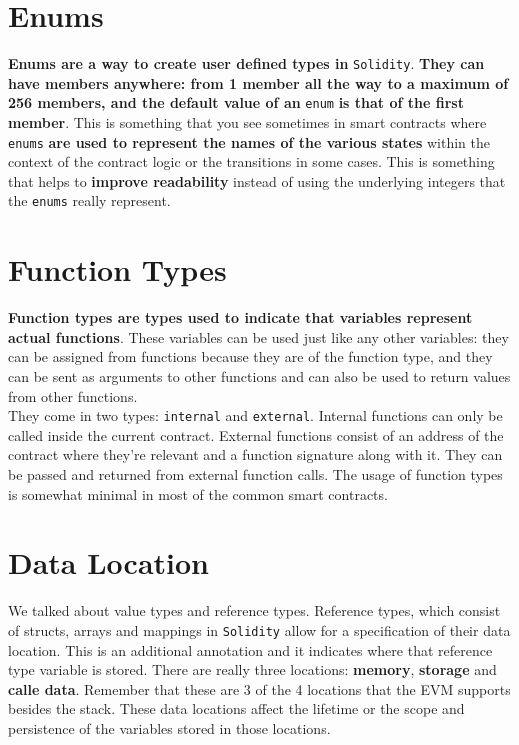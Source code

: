 \section{Enums}
\textbf{Enums are a way to create user defined types in} \texttt{Solidity}. \textbf{They can have members anywhere: from 1 member all the way to a maximum of 256 members, and the default value of an} \texttt{enum} \textbf{is that of the first member}. This is something that you see sometimes in smart contracts where \texttt{enums} \textbf{are used to represent the names of the various states} within the context of the contract logic or the transitions in some cases. This is something that helps to \textbf{improve readability} instead of using the underlying integers that the \texttt{enums} really represent.

\section{Function Types}
\textbf{Function types are types used to indicate that variables represent actual functions}. These variables can be used just like any other variables: they can be assigned from functions because they are of the function type, and they can be sent as arguments to other functions and can also be used to return values from other functions.\\
 
They come in two types: \texttt{internal} and \texttt{external}. Internal functions can only be called inside the current contract. External functions consist of an address of the contract where they're relevant and a function signature along with it. They can be passed and returned from external function calls. The usage of function types is somewhat minimal in most of the common smart contracts.

\section{Data Location}
We talked about value types and reference types. Reference types, which consist of structs, arrays and mappings in \texttt{Solidity} allow for a specification of their data location. This is an additional annotation and it indicates where that reference type variable is stored. There are really three locations: \textbf{memory}, \textbf{storage} and \textbf{calle data}. Remember that these are 3 of the 4 locations that the EVM supports besides the stack. These data locations affect the lifetime or the scope and persistence of the variables stored in those locations.

